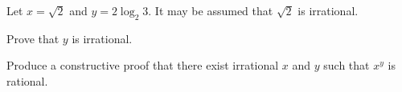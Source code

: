\begin{exercise}
    Let $x = \sqrt2$ and $y = 2\log_2{3}$. It may be assumed that $\sqrt2$ is irrational.
    \begin{partquestions}{\roman*}
        \item Prove that $y$ is irrational.
        \item Produce a constructive proof that there exist irrational $x$ and $y$ such that $x^y$ is rational.
    \end{partquestions}
\end{exercise}
